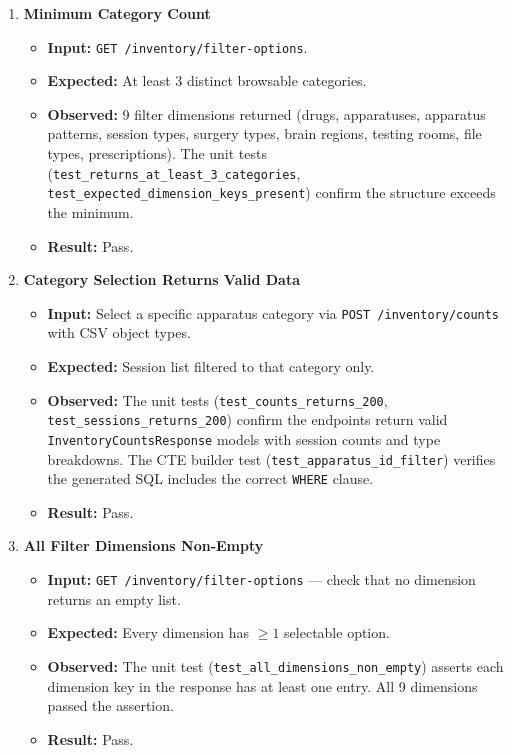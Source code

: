 \documentclass[12pt, titlepage]{article}
\begin{document}
\begin{enumerate}[label=\textbf{FR3-T\arabic*:}, leftmargin=*, labelsep=1em]
\sloppy

  \item \textbf{Minimum Category Count}
  \begin{itemize}
    \item \textbf{Input:} \texttt{GET /inventory/filter-options}.
    \item \textbf{Expected:} At least 3 distinct browsable categories.
    \item \textbf{Observed:} 9 filter dimensions returned (drugs, apparatuses, apparatus patterns, session
      types, surgery types, brain regions, testing rooms, file types, prescriptions).
      The unit tests (\texttt{test\_\allowbreak{}returns\_\allowbreak{}at\_\allowbreak{}least\_\allowbreak{}3\_\allowbreak{}categories},
      \texttt{test\_\allowbreak{}expected\_\allowbreak{}dimension\_\allowbreak{}keys\_\allowbreak{}present}) confirm the structure exceeds the minimum.
    \item \textbf{Result:} Pass.
  \end{itemize}

  \item \textbf{Category Selection Returns Valid Data}
  \begin{itemize}
    \item \textbf{Input:} Select a specific apparatus category via \texttt{POST /inventory/counts} with CSV object types.
    \item \textbf{Expected:} Session list filtered to that category only.
    \item \textbf{Observed:} The unit tests (\texttt{test\_\allowbreak{}counts\_\allowbreak{}returns\_200},
      \texttt{test\_\allowbreak{}sessions\_\allowbreak{}returns\_200}) confirm the endpoints return valid
      \texttt{Inventory\allowbreak{}Counts\allowbreak{}Response} models with session counts and type breakdowns.
      The CTE builder test (\texttt{test\_\allowbreak{}apparatus\_\allowbreak{}id\_\allowbreak{}filter}) verifies the generated SQL includes the correct \texttt{WHERE} clause.
    \item \textbf{Result:} Pass.
  \end{itemize}

  \item \textbf{All Filter Dimensions Non-Empty}
  \begin{itemize}
    \item \textbf{Input:} \texttt{GET /inventory/filter-options} --- check that no dimension returns an empty list.
    \item \textbf{Expected:} Every dimension has $\geq 1$ selectable option.
    \item \textbf{Observed:} The unit test (\texttt{test\_\allowbreak{}all\_\allowbreak{}dimensions\_\allowbreak{}non\_\allowbreak{}empty}) asserts
      each dimension key in the response has at least one entry. All 9 dimensions passed the assertion.
    \item \textbf{Result:} Pass.
  \end{itemize}

\end{enumerate}
\end{document}
